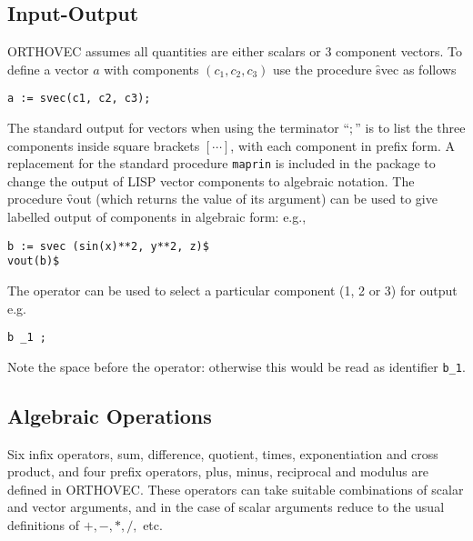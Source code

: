 \subsection{Input-Output}

\textsc{ORTHOVEC} assumes all quantities are either scalars or 3 component
vectors.  To define a vector $a$ with components $(c_1, c_2, c_3)$ use
the procedure \f{svec} as follows 
\hypertarget{operator:SVEC}{}
\begin{verbatim}
a := svec(c1, c2, c3);
\end{verbatim}

The standard \REDUCE output for vectors when using the terminator ``$;$''
is to list the three components inside square brackets
$[\cdots]$, with each component in prefix form.  A replacement for the
standard \REDUCE procedure \texttt{maprin} is included in
the package to change the 
output of LISP vector components to algebraic notation.  The procedure
 \f{vout} (which returns the value of its argument)
can be used to give labelled output of components 
in algebraic form: e.g.,
\begin{verbatim}
b := svec (sin(x)**2, y**2, z)$
vout(b)$
\end{verbatim}

The operator \texttt{\textunderscore} can be used to select a particular 
component (1, 2 or 3) for output e.g.
\begin{verbatim}
b _1 ;
\end{verbatim}
Note the space before the \texttt{\textunderscore} operator: otherwise this would be read as identifier \texttt{b\_1}.

\subsection{Algebraic Operations}

Six infix operators, sum, difference, quotient, times, exponentiation
and cross product, and four prefix
operators, plus, minus, reciprocal
and  modulus are defined in \textsc{ORTHOVEC}.  These operators can take suitable
combinations of scalar and vector arguments,
and in the case of scalar arguments reduce to the usual definitions of
$ +, -, *, /, $ etc.

